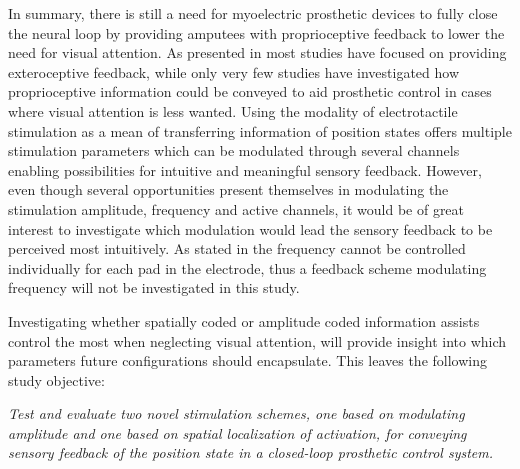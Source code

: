 

In summary, there is still a need for myoelectric prosthetic devices to fully close the neural loop by providing amputees with proprioceptive feedback to lower the need for visual attention. As presented in  most studies have focused on providing exteroceptive feedback, while only very few studies have investigated how proprioceptive information could be conveyed to aid prosthetic control in cases where visual attention is less wanted. Using the modality of electrotactile stimulation as a mean of transferring information of position states offers multiple stimulation parameters which can be modulated through several channels enabling possibilities for intuitive and meaningful sensory feedback. However, even though several opportunities present themselves in modulating the stimulation amplitude, frequency and active channels, it would be of great interest to investigate which modulation would lead the sensory feedback to be perceived most intuitively. As stated in  the frequency cannot be controlled individually for each pad in the electrode, thus a feedback scheme modulating frequency will not be investigated in this study. 

Investigating whether spatially coded or amplitude coded information assists control the most when neglecting visual attention, will provide insight into which parameters future configurations should encapsulate. This leaves the following study objective: 

\begin{center}
	\textit{Test and evaluate two novel stimulation schemes, one based on modulating amplitude and one based on spatial localization of activation, for conveying sensory feedback of the position state in a closed-loop prosthetic control system.}  
\end{center} 